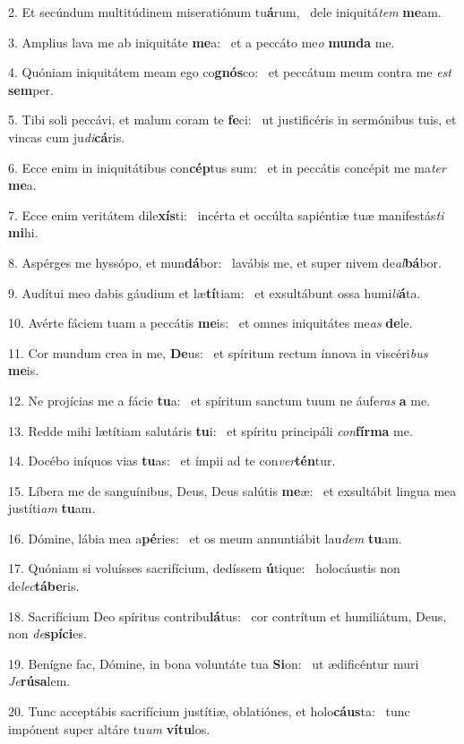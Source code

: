 2. Et secúndum multitúdinem miseratiónum tu\textbf{á}rum, \ast\  dele iniquitá\textit{tem} \textbf{me}am.\

3. Amplius lava me ab iniquitáte \textbf{me}a: \ast\  et a peccáto me\textit{o} \textbf{mun}\textbf{da} me.\

4. Quóniam iniquitátem meam ego co\textbf{gnós}co: \ast\  et peccátum meum contra me \textit{est} \textbf{sem}per.\

5. Tibi soli peccávi, et malum coram te \textbf{fe}ci: \ast\  ut justificéris in sermónibus tuis, et vincas cum ju\textit{di}\textbf{cá}ris.\

6. Ecce enim in iniquitátibus con\textbf{cép}tus sum: \ast\  et in peccátis concépit me ma\textit{ter} \textbf{me}a.\

7. Ecce enim veritátem dile\textbf{xís}ti: \ast\  incérta et occúlta sapiéntiæ tuæ manifestás\textit{ti} \textbf{mi}hi.\

8. Aspérges me hyssópo, et mun\textbf{dá}bor: \ast\  lavábis me, et super nivem de\textit{al}\textbf{bá}bor.\

9. Audítui meo dabis gáudium et læ\textbf{tí}tiam: \ast\  et exsultábunt ossa humi\textit{li}\textbf{á}ta.\

10. Avérte fáciem tuam a peccátis \textbf{me}is: \ast\  et omnes iniquitátes me\textit{as} \textbf{de}le.\

11. Cor mundum crea in me, \textbf{De}us: \ast\  et spíritum rectum ínnova in viscéri\textit{bus} \textbf{me}is.\

12. Ne projícias me a fácie \textbf{tu}a: \ast\  et spíritum sanctum tuum ne áufe\textit{ras} \textbf{a} me.\

13. Redde mihi lætítiam salutáris \textbf{tu}i: \ast\  et spíritu principáli \textit{con}\textbf{fír}\textbf{ma} me.\

14. Docébo iníquos vias \textbf{tu}as: \ast\  et ímpii ad te con\textit{ver}\textbf{tén}tur.\

15. Líbera me de sanguínibus, Deus, Deus salútis \textbf{me}æ: \ast\  et exsultábit lingua mea justíti\textit{am} \textbf{tu}am.\

16. Dómine, lábia mea a\textbf{pé}ries: \ast\  et os meum annuntiábit lau\textit{dem} \textbf{tu}am.\

17. Quóniam si voluísses sacrifícium, dedíssem \textbf{ú}tique: \ast\  holocáustis non de\textit{lec}\textbf{tá}\textbf{be}ris.\

18. Sacrifícium Deo spíritus contribu\textbf{lá}tus: \ast\  cor contrítum et humiliátum, Deus, non \textit{de}\textbf{spí}\textbf{ci}es.\

19. Benígne fac, Dómine, in bona voluntáte tua \textbf{Si}on: \ast\  ut ædificéntur muri \textit{Je}\textbf{rú}\textbf{sa}lem.\

20. Tunc acceptábis sacrifícium justítiæ, oblatiónes, et holo\textbf{cáus}ta: \ast\  tunc impónent super altáre tu\textit{um} \textbf{ví}\textbf{tu}los.\


